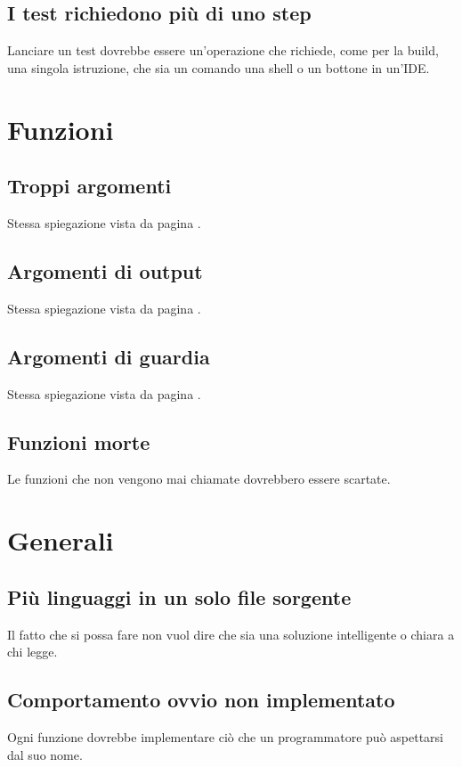 \documentclass[11pt,a4paper]{book}
\begin{document}
\subsection{I test richiedono più di uno step}
Lanciare un test dovrebbe essere un'operazione che richiede, come per la build, una singola istruzione, che sia un comando una shell o un bottone in un'IDE.

\section{Funzioni}
\subsection{Troppi argomenti}
Stessa spiegazione vista da pagina \pageref{par: argomenti funzioni}.

\subsection{Argomenti di output}
Stessa spiegazione vista da pagina \pageref{par: output}.

\subsection{Argomenti di guardia}
Stessa spiegazione vista da pagina \pageref{par: argomenti guardia}.

\subsection{Funzioni morte}
Le funzioni che non vengono mai chiamate dovrebbero essere scartate.

\section{Generali}
\subsection{Più linguaggi in un solo file sorgente}
Il fatto che si possa fare non vuol dire che sia una soluzione intelligente o chiara a chi legge. 

\subsection{Comportamento ovvio non implementato}
Ogni funzione dovrebbe implementare ciò che un programmatore può aspettarsi dal suo nome.
\end{document}
